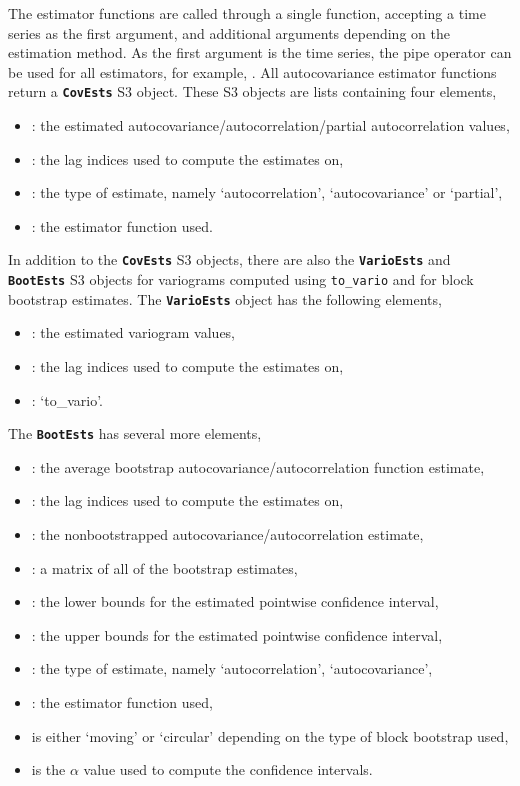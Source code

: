 The estimator functions are called through a single function, accepting a time series as the first argument, and additional arguments depending on the estimation method. As the first argument is the time series, the pipe operator \code{|>} can be used for all estimators, for example, .
All autocovariance estimator functions return a \textbf{\texttt{CovEsts}} S3 object. These S3 objects are lists containing four elements,
\begin{itemize}
    \item {}: the estimated autocovariance/autocorrelation/partial autocorrelation values,
    \item {}: the lag indices used to compute the estimates on,
    \item {}: the type of estimate, namely `autocorrelation', `autocovariance' or `partial',
    \item {}: the estimator function used.
\end{itemize}

In addition to the \textbf{\texttt{CovEsts}} S3 objects, there are also the \textbf{\texttt{VarioEsts}} and \textbf{\texttt{BootEsts}} S3 objects for variograms computed using \texttt{to\_vario} and for block bootstrap estimates.
The \textbf{\texttt{VarioEsts}} object has the following elements,
\begin{itemize}
    \item {}: the estimated variogram values,
    \item {}: the lag indices used to compute the estimates on,
    \item {}: `to\_vario'.
\end{itemize}

The \textbf{\texttt{BootEsts}} has several more elements, 
\begin{itemize}
    \item {}: the average bootstrap autocovariance/autocorrelation function estimate,
    \item {}: the lag indices used to compute the estimates on,
    \item {}: the nonbootstrapped autocovariance/autocorrelation estimate,
    \item {}: a matrix of all of the bootstrap estimates,
    \item {}: the lower bounds for the estimated pointwise confidence interval,
    \item {}: the upper bounds for the estimated pointwise confidence interval,
    \item {}: the type of estimate, namely `autocorrelation', `autocovariance',
    \item {}: the estimator function used,
    \item {} is either `moving' or `circular' depending on the type of block bootstrap used,
    \item {} is the \(\alpha\) value used to compute the confidence intervals.
\end{itemize}

